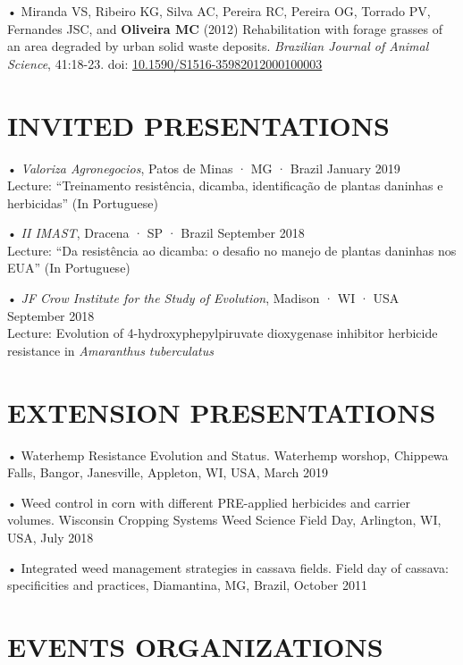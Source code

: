 \documentclass[11pt,]{article}
\begin{document}
• Miranda VS, Ribeiro KG, Silva AC, Pereira RC, Pereira OG, Torrado PV,
Fernandes JSC, and \textbf{Oliveira MC} (2012) Rehabilitation with
forage grasses of an area degraded by urban solid waste deposits.
\emph{Brazilian Journal of Animal Science}, 41:18-23. doi:
\href{http://www.scielo.br/scielo.php?script=sci_arttext\&pid=S1516-35982012000100003}{10.1590/S1516-35982012000100003}

\hypertarget{invited-presentations}{%
\section{INVITED PRESENTATIONS}\label{invited-presentations}}

• \emph{Valoriza Agronegocios}, Patos de Minas · MG · Brazil
\hfill January 2019\\
Lecture: ``Treinamento resistência, dicamba, identificação de plantas
daninhas e herbicidas'' (In Portuguese)

• \emph{II IMAST}, Dracena · SP · Brazil \hfill September 2018\\
Lecture: ``Da resistência ao dicamba: o desafio no manejo de plantas
daninhas nos EUA'' (In Portuguese)

• \emph{JF Crow Institute for the Study of Evolution}, Madison · WI ·
USA \hfill September 2018\\
Lecture: Evolution of 4-hydroxyphepylpiruvate dioxygenase inhibitor
herbicide resistance in \emph{Amaranthus tuberculatus}

\hypertarget{extension-presentations}{%
\section{EXTENSION PRESENTATIONS}\label{extension-presentations}}

• Waterhemp Resistance Evolution and Status. Waterhemp worshop, Chippewa
Falls, Bangor, Janesville, Appleton, WI, USA, March 2019

• Weed control in corn with different PRE-applied herbicides and carrier
volumes. Wisconsin Cropping Systems Weed Science Field Day, Arlington,
WI, USA, July 2018

• Integrated weed management strategies in cassava fields. Field day of
cassava: specificities and practices, Diamantina, MG, Brazil, October
2011

\hypertarget{events-organizations}{%
\section{EVENTS ORGANIZATIONS}\label{events-organizations}}
\end{document}
